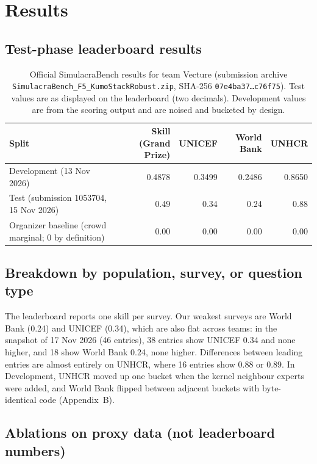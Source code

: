 \documentclass{article}
\newcommand{\teamid}{Vecture}
\begin{document}
\section{Results}
\label{sec:results}

\subsection{Test-phase leaderboard results}
\begin{table}[h]
  \centering
  \small
  \caption{Official SimulacraBench results for team \teamid{} (submission archive \texttt{SimulacraBench\_F5\_KumoStackRobust.zip}, SHA-256 \texttt{07e4ba37\ldots c76f75}). Test values are as displayed on the leaderboard (two decimals). Development values are from the scoring output and are noised and bucketed by design.}
  \label{tab:results}
  \begin{tabular}{lrrrr}
    \toprule
    Split & Skill (Grand Prize) & UNICEF & World Bank & UNHCR \\
    \midrule
    Development (13 Nov 2026) & 0.4878 & 0.3499 & 0.2486 & 0.8650 \\
    Test (submission 1053704, 15 Nov 2026) & 0.49 & 0.34 & 0.24 & 0.88 \\
    Organizer baseline (crowd marginal; 0 by definition) & 0.00 & 0.00 & 0.00 & 0.00 \\
    \bottomrule
  \end{tabular}
\end{table}

\subsection{Breakdown by population, survey, or question type}
The leaderboard reports one skill per survey. Our weakest surveys are World Bank (0.24) and UNICEF (0.34), which are also flat across teams: in the snapshot of 17 Nov 2026 (46 entries), 38 entries show UNICEF 0.34 and none higher, and 18 show World Bank 0.24, none higher. Differences between leading entries are almost entirely on UNHCR, where 16 entries show 0.88 or 0.89. In Development, UNHCR moved up one bucket when the kernel neighbour experts were added, and World Bank flipped between adjacent buckets with byte-identical code (Appendix~B).

\subsection{Ablations on proxy data (not leaderboard numbers)}
\label{sec:ablation}


\end{document}
